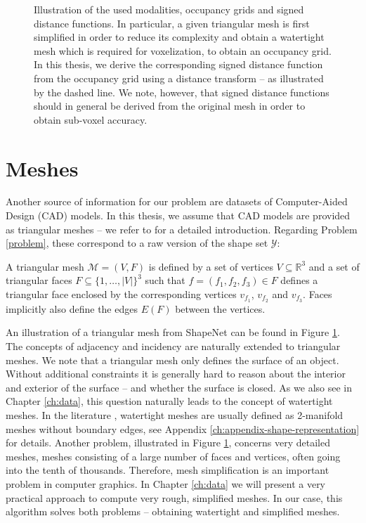 \begin{figure}
  \caption{Illustration of the used modalities, \ie occupancy grids and
  signed distance functions. In particular, a given triangular mesh is first
  simplified in order to reduce its complexity and obtain a watertight mesh
  which is required for voxelization, \ie to obtain an occupancy grid.
  In this thesis, we derive the corresponding signed distance function from the occupancy
  grid using a distance transform -- as illustrated by the dashed line. We note,
  however, that signed distance functions should in general be derived from
  the original mesh in order to obtain sub-voxel accuracy.}
  \label{fig:shape-representation}
\end{figure}

\section{Meshes}

Another source of information for our problem are datasets
of Computer-Aided Design (CAD) models. In this thesis, we assume that
CAD models are provided as triangular meshes -- we refer to
\cite{BotschKobbelt:2010} for a detailed introduction.
Regarding Problem \ref{problem},
these correspond to a raw version of the shape set $\mathcal{Y}$:

\begin{definition}
  A triangular mesh $\mathcal{M} = (V, F)$ is defined by a set of 
  vertices $V \subseteq \mathbb{R}^3$ and a set of triangular faces
  $F \subseteq \{1,\ldots,|V|\}^3$ such that $f = (f_1, f_2, f_3) \in F$
  defines a triangular face enclosed by the corresponding vertices
  $v_{f_1}$, $v_{f_2}$ and $v_{f_3}$. Faces implicitly also define the edges
  $E(F)$ between the vertices.
\end{definition}

An illustration of a triangular mesh from ShapeNet can be found in Figure
\ref{fig:shape-representation}. The concepts of adjacency and incidency
are naturally extended to triangular meshes. We note that a triangular mesh
only defines the surface of an object. Without additional constraints it is
generally hard to reason about the interior and exterior of the surface
-- and whether the surface is closed.
As we also see in Chapter \ref{ch:data}, this question naturally leads to the
concept of watertight meshes. In the literature \cite[Section~1.3]{BotschKobbelt:2010},
watertight meshes are usually defined as 2-manifold meshes without boundary edges,
see Appendix \ref{ch:appendix-shape-representation} for details.
Another problem, illustrated in Figure \ref{fig:shape-representation}, concerns
very detailed meshes, \ie meshes consisting of a
large number of faces and vertices, often going into the tenth of thousands. 
Therefore, mesh simplification \cite[Chapter~6]{BotschKobbelt:2010} is an important
problem in computer graphics. In Chapter \ref{ch:data} we will present a very
practical approach to compute very rough, simplified meshes. In our case, this algorithm
solves both problems -- obtaining watertight and simplified meshes.

